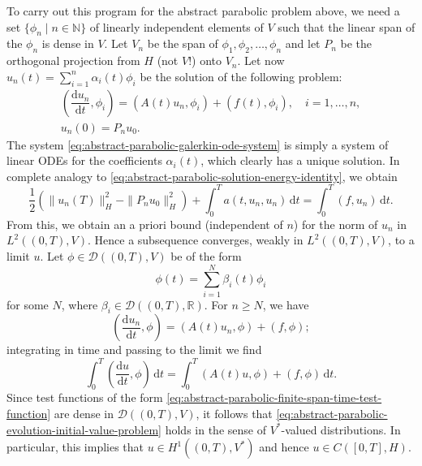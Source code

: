 To carry out this program for the abstract parabolic problem above, we need a set $\{\phi_n\mid n\in\mathbb{N}\}$ of linearly independent elements of $V$ such that the linear span of the $\phi_n$ is dense in $V$. Let $V_n$ be the span of $\phi_1,\phi_2,\ldots,\phi_n$ and let $P_n$ be the orthogonal projection from $H$ (not $V$!) onto $V_n$. Let now $u_n(t)=\sum_{i=1}^n\alpha_i(t)\phi_i$ be the solution of the following problem:
\begin{equation}\label{eq:abstract-parabolic-galerkin-ode-system}
\begin{gathered}\left(\dfrac{\mathrm{d}u_n}{\mathrm{d}t},\phi_i\right)=(A(t)u_n,\phi_i)+(f(t),\phi_i),\quad i=1,\ldots,n,\\u_n(0)=P_nu_0.\end{gathered}
\end{equation}
The system \eqref{eq:abstract-parabolic-galerkin-ode-system} is simply a system of linear ODEs for the coefficients $\alpha_i(t)$, which clearly has a unique solution. In complete analogy to \eqref{eq:abstract-parabolic-solution-energy-identity}, we obtain
\begin{equation}\label{eq:abstract-parabolic-galerkin-energy-identity}
\dfrac{1}{2}(\|u_n(T)\|_H^2-\|P_nu_0\|_H^2)+\int_0^T a(t,u_n,u_n)\,\mathrm{d}t=\int_0^T(f,u_n)\,\mathrm{d}t.
\end{equation}
From this, we obtain an a priori bound (independent of $n$) for the norm of $u_n$ in $L^2((0,T),\allowbreak V)$. Hence a subsequence converges, weakly in $L^2((0,T),\allowbreak V)$, to a limit $u$. Let $\phi\in\mathcal{D}((0,T),V)$ be of the form
\begin{equation}\label{eq:abstract-parabolic-finite-span-time-test-function}
\phi(t)=\sum_{i=1}^N\beta_i(t)\phi_i
\end{equation}
for some $N$, where $\beta_i\in\mathcal{D}((0,T),\mathbb{R})$. For $n\geq N$, we have
\begin{equation}\label{eq:abstract-parabolic-galerkin-finite-test-identity}
\left(\dfrac{\mathrm{d}u_n}{\mathrm{d}t},\phi\right)=(A(t)u_n,\phi)+(f,\phi);
\end{equation}
integrating in time and passing to the limit we find
\begin{equation}\label{eq:abstract-parabolic-galerkin-distributional-limit}
\int_0^T\left(\dfrac{\mathrm{d}u}{\mathrm{d}t},\phi\right)\,\mathrm{d}t=\int_0^T(A(t)u,\phi)+(f,\phi)\,\mathrm{d}t.
\end{equation}
Since test functions of the form \eqref{eq:abstract-parabolic-finite-span-time-test-function} are dense in $\mathcal{D}((0,T),V)$, it follows that \eqref{eq:abstract-parabolic-evolution-initial-value-problem} holds in the sense of $V^*$-valued distributions. In particular, this implies that $u\in H^1((0,T),V^*)$ and hence $u\in C([0,T],H)$.


